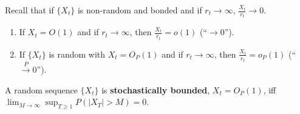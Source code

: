 \documentclass[11pt]{elegantbook}
\begin{document}
Recall that if $\{X_t\}$ is non-random and bonded and if $r_t \rightarrow \infty$, $\frac{X_t}{r_t} \rightarrow 0$.
\begin{enumerate}
    \item If $X_t=O(1)$ and if $r_t \rightarrow \infty$, then $\frac{X_t}{r_t}=o(1)$ (``$\rightarrow 0$'').
    \item If $\{X_t\}$ is random with $X_t=O_P(1)$ and if $r_t \rightarrow \infty$, then $\frac{X_t}{r_t}=o_P(1)$ (``$\stackrel{P}{\longrightarrow} 0$'').
\end{enumerate}

\begin{definition}
    A random sequence $\{X_t\}$ is \textbf{stochastically bounded}, $X_t=O_P(1)$, iff $\lim_{M \rightarrow \infty}\sup_{T\geq 1}P(|X_T|>M)=0$.
\end{definition}
\end{document}
